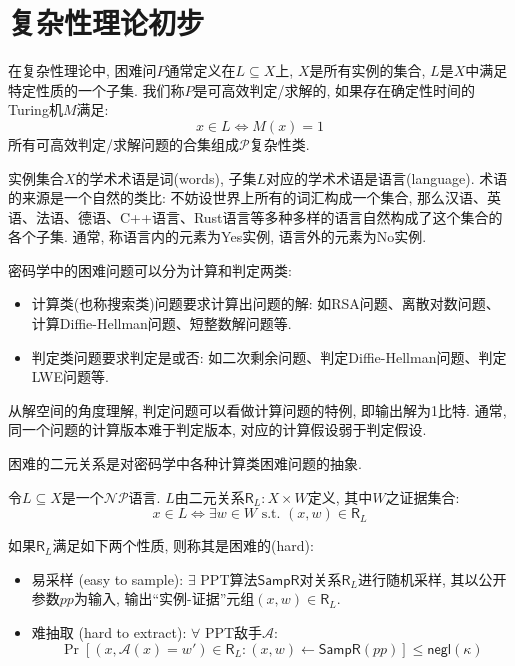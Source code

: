 \section{复杂性理论初步}
在复杂性理论中, 困难问$P$通常定义在$L \subseteq X$上, $X$是所有实例的集合, $L$是$X$中满足特定性质的一个子集. 
我们称$P$是可高效判定/求解的, 如果存在确定性时间的Turing机$M$满足: 
\begin{equation*}
	x \in L \iff M(x) = 1  
\end{equation*}
所有可高效判定/求解问题的合集组成$\mathcal{P}$复杂性类. 

\begin{note}
实例集合$X$的学术术语是词(words), 子集$L$对应的学术术语是语言(language). 
术语的来源是一个自然的类比: 不妨设世界上所有的词汇构成一个集合, 那么汉语、英语、法语、德语、C++语言、Rust语言等多种多样的语言自然构成了这个集合的各个子集.  
通常, 称语言内的元素为Yes实例, 语言外的元素为No实例. 
\end{note}

密码学中的困难问题可以分为计算和判定两类: 
\begin{itemize}
	\item 计算类(也称搜索类)问题要求计算出问题的解: 如RSA问题、离散对数问题、计算Diffie-Hellman问题、短整数解问题等. 
	\item 判定类问题要求判定是或否: 如二次剩余问题、判定Diffie-Hellman问题、判定LWE问题等. 
\end{itemize}
从解空间的角度理解, 判定问题可以看做计算问题的特例, 即输出解为1比特. 通常, 同一个问题的计算版本难于判定版本, 对应的计算假设弱于判定假设.    

困难的二元关系是对密码学中各种计算类困难问题的抽象.  
\begin{definition}
令$L \subseteq X$是一个$\mathcal{NP}$语言. 
$L$由二元关系$\mathsf{R}_L: X \times W$定义, 其中$W$之证据集合: 
\begin{equation*}
    x \in L \Leftrightarrow \exists w \in W \text{~s.t.~} (x, w) \in \mathsf{R}_L
\end{equation*}

如果$\mathsf{R}_L$满足如下两个性质, 则称其是困难的(hard):
\begin{itemize}
    \item 易采样 (easy to sample):  $\exists$ PPT算法$\mathsf{SampR}$对关系$\mathsf{R}_L$进行随机采样, 
    	其以公开参数$pp$为输入, 输出``实例-证据''元组$(x, w) \in \mathsf{R}_L$. 

    \item 难抽取 (hard to extract): $\forall$ PPT敌手$\mathcal{A}$:
    \begin{equation*} 
    	\Pr[(x, \mathcal{A}(x) = w') \in \mathsf{R}_L: (x, w) \leftarrow \mathsf{SampR}(pp)] \leq \mathsf{negl}(\kappa)
    \end{equation*}
\end{itemize} 
\end{definition}

